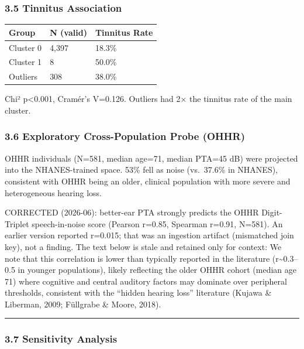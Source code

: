 \documentclass[
]{article}
\newcounter{none} %
\begin{document}
\subsubsection{3.5 Tinnitus Association}\label{tinnitus-association}

{\def\LTcaptype{none} %
\begin{longtable}[]{@{}lll@{}}
\toprule\noalign{}
Group & N (valid) & Tinnitus Rate \\
\midrule\noalign{}
\endhead
\bottomrule\noalign{}
\endlastfoot
Cluster 0 & 4,397 & 18.3\% \\
Cluster 1 & 8 & 50.0\% \\
Outliers & 308 & 38.0\% \\
\end{longtable}
}

Chi² p\textless0.001, Cramér's V=0.126. Outliers had 2× the tinnitus rate of the
main cluster.

\subsubsection{3.6 Exploratory Cross-Population Probe (OHHR)}\label{external-validation-ohhr-1}

OHHR individuals (N=581, median age=71, median PTA=45 dB) were projected into
the NHANES-trained space. 53\% fell as noise (vs.~37.6\% in NHANES), consistent
with OHHR being an older, clinical population with more severe and heterogeneous
hearing loss.

CORRECTED (2026-06): better-ear PTA strongly predicts the OHHR Digit-Triplet
speech-in-noise score (Pearson r=0.85, Spearman r=0.91, N=581). An earlier
version reported r=0.015; that was an ingestion artifact (mismatched join key),
not a finding. The text below is stale and retained only for context: We note that this correlation is lower than
typically reported in the literature (r\textasciitilde0.3--0.5 in younger
populations), likely reflecting the older OHHR cohort (median age 71) where
cognitive and central auditory factors may dominate over peripheral thresholds,
consistent with the ``hidden hearing loss'' literature (Kujawa \& Liberman,
2009; Füllgrabe \& Moore, 2018).

\begin{center}\rule{0.5\linewidth}{0.5pt}\end{center}

\subsubsection{3.7 Sensitivity Analysis}\label{sensitivity-analysis}
\end{document}
